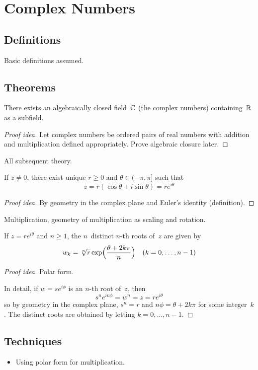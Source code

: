 %
%
\section{Complex Numbers}
\subsection*{Definitions}
Basic definitions assumed.
\subsection*{Theorems}
\begin{thm}[Existence of~\(\C\)]
There exists an algebraically closed field~\(\C\) (the complex numbers) containing~\(\mathbb{R}\) as a subfield.
\end{thm}
\begin{proof}[Proof idea]
Let complex numbers be ordered pairs of real numbers with addition and multiplication defined appropriately. Prove algebraic closure later.
\end{proof}
\begin{app}
All subsequent theory.
\end{app}

\begin{thm}
If \(z\ne0\), there exist unique \(r\ge0\) and \(\theta\in(-\pi,\pi]\) such that
\[z=r(\cos\theta+i\sin\theta)=re^{i\theta}\]
\end{thm}
\begin{proof}[Proof idea]
By geometry in the complex plane and Euler's identity (definition).
\end{proof}
\begin{app}
Multiplication, geometry of multiplication as scaling and rotation.
\end{app}

\begin{thm}[Roots]
If \(z=re^{i\theta}\) and \(n\ge1\), the \(n\)~distinct \(n\)-th roots of~\(z\) are given by
\[w_k=\sqrt[n]{r}\exp\Bigl(\frac{\theta+2k\pi}{n}\Bigr)\quad(k=0,\ldots,n-1)\]
\end{thm}
\begin{proof}[Proof idea]
Polar form.

In detail, if \(w=se^{i\phi}\) is an \(n\)-th root of~\(z\), then
\[s^ne^{in\phi}=w^n=z=re^{i\theta}\]
so by geometry in the complex plane, \(s^n=r\) and \(n\phi=\theta+2k\pi\) for some integer~\(k\). The distinct roots are obtained by letting \(k=0,\ldots,n-1\).
\end{proof}

\subsection*{Techniques}
\begin{itemize}[itemsep=0pt]
\item Using polar form for multiplication.
\end{itemize}
